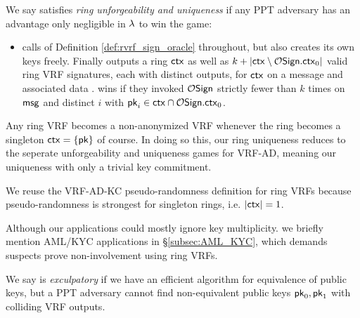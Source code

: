 \begin{definition}
We say \rVRF satisfies {\em ring unforgeability and uniqueness} if
any PPT adversary \adv has an advantage only
 negligible in $\lambda$ to win the game:
\begin{itemize}
\item[]
 \adv calls  of Definition \ref{def:rvrf_sign_oracle} throughout,
 but also creates its own keys freely.
 Finally \adv outputs a ring $\mathsf{ctx}$ as well as
 $k + |\mathsf{ctx} \setminus \mathcal{O}\mathsf{Sign}.\mathsf{ctx}_0|$ valid ring VRF signatures,
  each with distinct outputs,    %
 for $\mathsf{ctx}$ on a message \msg and associated data \aux.
 \adv wins if they invoked $\mathcal{O}\mathsf{Sign}$ strictly fewer than $k$ times on $\mathsf{msg}$  %
  and distinct $i$ with $\mathsf{pk}_i \in \mathsf{ctx} \cap \mathcal{O}\mathsf{Sign}.\mathsf{ctx}_0$.
\end{itemize}
\end{definition}
 
Any ring VRF becomes a non-anonymized VRF whenever
 the ring becomes a singleton $\mathsf{ctx} = \{ \mathsf{pk} \}$ of course.
In doing so this, our ring uniqueness reduces to
 the seperate unforgeability and uniqueness games for VRF-AD,
meaning our uniqueness with only a trivial key commitment.

We reuse the VRF-AD-KC pseudo-randomness definition for ring VRFs
because pseudo-randomness is strongest for singleton rings, i.e. $|\mathsf{ctx}| = 1$.

\smallskip 

Although our applications could mostly ignore key multiplicity. 
we briefly mention AML/KYC applications in \S\ref{subsec:AML_KYC},
which demands suspects prove non-involvement using ring VRFs.

\begin{definition}
We say \rVRF is {\em exculpatory} if we have an efficient algorithm
for equivalence of public keys, but a PPT adversary \adv cannot
find non-equivalent public keys $\mathsf{pk}_0,\mathsf{pk}_1$ with colliding VRF outputs.
\end{definition} 



